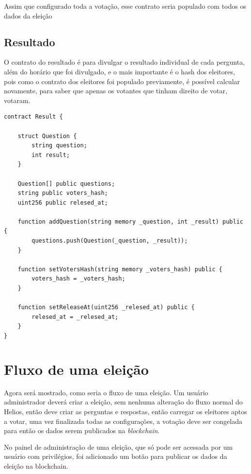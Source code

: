 \documentclass{ufsctex/ufsctex}
\begin{document}
Assim que configurado toda a votação, esse contrato seria populado com todos os dados da eleição


\subsection{Resultado}

O contrato do resultado é para divulgar o resultado individual de cada
pergunta, além do horário que foi divulgado, e o mais importante é o hash dos
eleitores, pois como o contrato dos eleitores foi populado previamente, é
possível calcular novamente, para saber que apenas os votantes que tinham
direito de votar, votaram.

\begin{lstlisting}[language=Solidity]
contract Result {
    
    struct Question {
        string question;
        int result;
    }
    
    Question[] public questions;
    string public voters_hash;
    uint256 public relesed_at;
    
    function addQuestion(string memory _question, int _result) public {
        questions.push(Question(_question, _result));
    }
    
    function setVotersHash(string memory _voters_hash) public {
        voters_hash = _voters_hash;
    }
    
    function setReleaseAt(uint256 _relesed_at) public {
        relesed_at = _relesed_at;
    }
}
\end{lstlisting}

\section{Fluxo de uma eleição}

Agora será mostrado, como seria o fluxo de uma eleição. Um usuário
administrador deverá criar a eleição, sem nenhuma alteração do fluxo normal do
Helios, então deve criar as perguntas e respostas, então carregar os eleitores
aptos a votar, uma vez finalizada todas as configurações, a votação deve ser
congelada para então os dados serem publicados na \textit{blockchain}.

No painel de administração de uma eleição, que só pode ser acessada por um
usuário com privilégios, foi adicionado um botão para publicar os dados da
eleição na blockchain.
\end{document}
